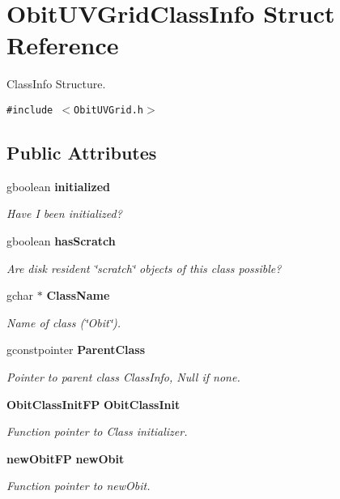 \section{Obit\-UVGrid\-Class\-Info Struct Reference}
\label{structObitUVGridClassInfo}
Class\-Info Structure.  


{\tt \#include $<$Obit\-UVGrid.h$>$}

\subsection*{Public Attributes}
\begin{CompactItemize}
\item 
gboolean {\bf initialized}
\begin{CompactList}\small\item\em Have I been initialized? \item\end{CompactList}\item 
gboolean {\bf has\-Scratch}
\begin{CompactList}\small\item\em Are disk resident \char`\"{}scratch\char`\"{} objects of this class possible? \item\end{CompactList}\item 
gchar $\ast$ {\bf Class\-Name}
\begin{CompactList}\small\item\em Name of class (\char`\"{}Obit\char`\"{}). \item\end{CompactList}\item 
gconstpointer {\bf Parent\-Class}
\begin{CompactList}\small\item\em Pointer to parent class Class\-Info, Null if none. \item\end{CompactList}\item 
{\bf Obit\-Class\-Init\-FP} {\bf Obit\-Class\-Init}
\begin{CompactList}\small\item\em Function pointer to Class initializer. \item\end{CompactList}\item 
{\bf new\-Obit\-FP} {\bf new\-Obit}
\begin{CompactList}\small\item\em Function pointer to new\-Obit. \item\end{CompactList}\item 

\end{CompactItemize}
